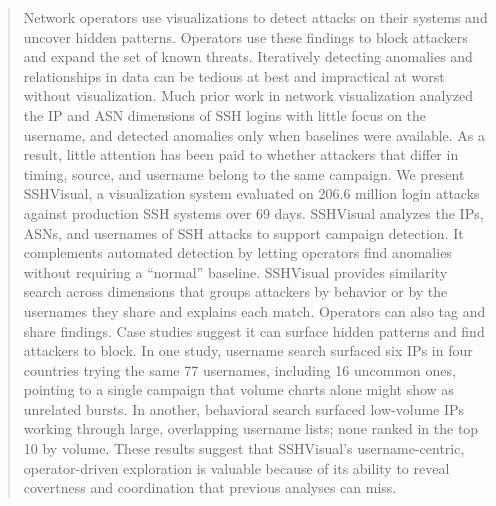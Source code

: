 \documentclass[conference]{IEEEtran}
\begin{document}
\begin{abstract}
Network operators use visualizations to detect attacks on their systems and uncover hidden patterns. Operators 
use these findings to block attackers and expand the set of known threats. Iteratively detecting 
anomalies and relationships in data can be tedious at best and impractical at worst without visualization. 
Much prior work in network visualization analyzed the IP and ASN dimensions of SSH logins with little 
focus on the username, and detected anomalies only when baselines were available. As a result, little 
attention has been paid to whether attackers that differ in timing, source, and username belong to the same 
campaign. We present SSHVisual, a visualization system evaluated on 206.6 million login attacks against
production SSH systems over 69 days. SSHVisual analyzes the IPs, ASNs, and usernames of SSH attacks to support
campaign detection. It complements automated detection by letting operators find anomalies without requiring a
``normal'' baseline. SSHVisual provides similarity search across dimensions that groups attackers by behavior
or by the usernames they share and explains each match. Operators can also tag and share findings. Case studies
suggest it can surface hidden patterns and find attackers to block. In one study, username search surfaced six
IPs in four countries trying the same 77 usernames, including 16 uncommon ones, pointing to a single campaign
that volume charts alone might show as unrelated bursts. In another, behavioral search surfaced low-volume IPs
working through large, overlapping username lists; none ranked in the top 10 by volume. These results
suggest that SSHVisual's username-centric, operator-driven exploration is valuable because of its ability to
reveal covertness and coordination that previous analyses can miss.

\end{abstract}
\end{document}
